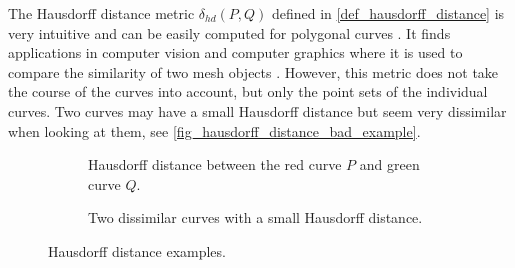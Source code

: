 \documentclass[
oneside,
fontsize=11pt
]{scrartcl}
\begin{document}
The Hausdorff distance metric $\delta_{hd}(P,Q)$ defined in \autoref{def_hausdorff_distance} 
is very intuitive and can be easily computed for polygonal curves \cite{ko_complexity_2013}.
It finds applications in computer vision and computer graphics 
where it is used to compare the similarity of two mesh objects \cite{cignoni_metro_1998,ko_complexity_2013}. 
However, this metric does not take the course of the curves into account, 
but only the point sets of the individual curves.
Two curves may have a small Hausdorff distance but seem very dissimilar 
when looking at them, see \autoref{fig_hausdorff_distance_bad_example}.

\begin{figure}[ht]
  \centering
  \begin{subfigure}[b]{0.45\textwidth}
      \caption{Hausdorff distance between the red curve $P$ and green curve $Q$. }
      \label{fig_hausdorff_distance_example}
  \end{subfigure}
  \hfill
  \begin{subfigure}[b]{0.45\textwidth}
      \caption[Hausdorff distance of two dissimilar curves]{Two dissimilar curves with a small Hausdorff distance.}
      \label{fig_hausdorff_distance_bad_example}
  \end{subfigure}
  \caption[Hausdorff distance examples]{Hausdorff distance examples.}
  \label{fig_hausdorff_distance_examples}
\end{figure}
\end{document}
